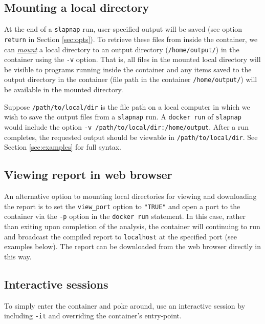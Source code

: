 \documentclass[]{article}
\begin{document}
\subsection{Mounting a local directory}\label{sec:mounting}

At the end of a \texttt{slapnap} run, user-specified output will be
saved (see option \texttt{return} in Section \ref{sec:opts}). To
retrieve these files from inside the container, we can
\href{https://docs.docker.com/storage/bind-mounts/}{\emph{mount}} a
local directory to an output directory (\texttt{/home/output/}) in the
container using the \texttt{-v} option. That is, all files in the
mounted local directory will be visible to programs running inside the
container and any items saved to the output directory in the container
(file path in the container \texttt{/home/output/}) will be available in
the mounted directory.

Suppose \texttt{/path/to/local/dir} is the file path on a local computer
in which we wish to save the output files from a \texttt{slapnap} run. A
\texttt{docker\ run} of \texttt{slapnap} would include the option
\texttt{-v\ /path/to/local/dir:/home/output}. After a run completes, the
requested output should be viewable in \texttt{/path/to/local/dir}. See
Section \ref{sec:examples} for full syntax.

\subsection{Viewing report in web browser}\label{sec:viewreport}

An alternative option to mounting local directories for viewing and
downloading the report is to set the \texttt{view\_port} option to
\texttt{"TRUE"} and open a port to the container via the \texttt{-p}
option in the \texttt{docker\ run} statement. In this case, rather than
exiting upon completion of the analysis, the container will continuing
to run and broadcast the compiled report to \texttt{localhost} at the
specified port (see examples below). The report can be downloaded from
the web browser directly in this way.

\subsection{Interactive sessions}\label{interactive-sessions}

To simply enter the container and poke around, use an interactive
session by including \texttt{-it} and overriding the container's
entry-point.
\end{document}
